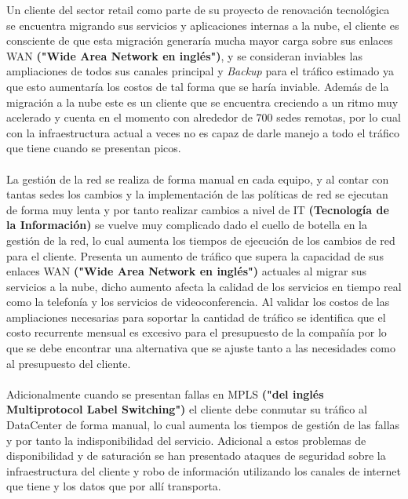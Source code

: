 Un cliente del sector retail como parte de su proyecto de renovación tecnológica se encuentra migrando sus servicios y aplicaciones internas a la nube, el cliente es consciente de que esta migración generaría mucha mayor carga sobre sus enlaces WAN \textbf{("Wide Area Network en inglés")}, y se consideran inviables las ampliaciones de todos sus canales principal y \textit{Backup} para el tráfico estimado ya que esto aumentaría los costos de tal forma que se haría inviable. Además de la migración a la nube este es un cliente que se encuentra creciendo a un ritmo muy acelerado y cuenta en el momento con alrededor de 700 sedes remotas, por lo cual con la infraestructura actual a veces no es capaz de darle manejo a todo el tráfico que tiene cuando se presentan picos.
\\
\\
La gestión de la red se realiza de forma manual en cada equipo, y al contar con tantas sedes los cambios y la implementación de las políticas de red se ejecutan de forma muy lenta y por tanto realizar cambios a nivel de IT \textbf{(Tecnología de la Información)} se vuelve muy complicado dado el cuello de botella en la gestión de la red, lo cual aumenta los tiempos de ejecución de los cambios de red para el cliente.
Presenta un aumento de tráfico que supera la capacidad de sus enlaces WAN \textbf{("Wide Area Network en inglés")} actuales al migrar sus servicios a la nube, dicho aumento afecta la calidad de los servicios en tiempo real como la telefonía y los servicios de videoconferencia. Al validar los costos de las ampliaciones necesarias para soportar la cantidad de tráfico se identifica que el costo recurrente mensual es excesivo para el presupuesto de la compañía por lo que se debe encontrar una alternativa que se ajuste tanto a las necesidades como al presupuesto del cliente.
\\
\\
Adicionalmente cuando se presentan fallas en MPLS \textbf{("del inglés Multiprotocol Label Switching")} el cliente debe conmutar su tráfico al DataCenter de forma manual, lo cual aumenta los tiempos de gestión de las fallas y por tanto la indisponibilidad del servicio. Adicional a estos problemas de disponibilidad y de saturación se han presentado ataques de seguridad sobre la infraestructura del cliente y robo de información utilizando los canales de internet que tiene y los datos que por allí transporta.
\\
\\
